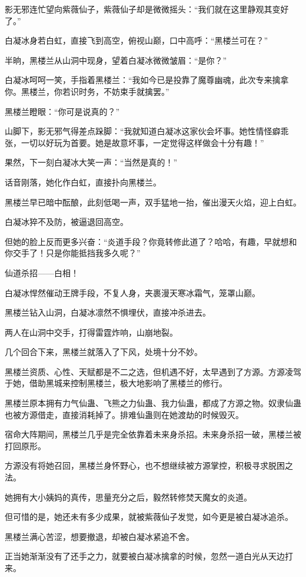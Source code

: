 \begin{this_body}
影无邪连忙望向紫薇仙子，紫薇仙子却是微微摇头：“我们就在这里静观其变好了。”

白凝冰身若白虹，直接飞到高空，俯视山巅，口中高呼：“黑楼兰可在？”

半晌，黑楼兰从山洞中现身，望着白凝冰微微皱眉：“是你？”

白凝冰呵呵一笑，手指着黑楼兰：“我如今已是投靠了魔尊幽魂，此次专来擒拿你。黑楼兰，你若识时务，不妨束手就擒罢。”

黑楼兰瞪眼：“你可是说真的？”

山脚下，影无邪气得差点跺脚：“我就知道白凝冰这家伙会坏事。她性情怪癖乖张，一切以好玩为首要。她是故意坏事，一定觉得这样做会十分有趣！”

果然，下一刻白凝冰大笑一声：“当然是真的！”

话音刚落，她化作白虹，直接扑向黑楼兰。

黑楼兰早已暗中酝酿，此刻低喝一声，双手猛地一抬，催出漫天火焰，迎上白虹。

白凝冰猝不及防，被逼退回高空。

但她的脸上反而更多兴奋：“炎道手段？你竟转修此道了？哈哈，有趣，早就想和你交手了！只是你能抵挡我多久呢？”

仙道杀招——白相！

白凝冰悍然催动王牌手段，不复人身，夹裹漫天寒冰霜气，笼罩山巅。

黑楼兰钻入山洞，白凝冰凛然不惧埋伏，直接冲杀进去。

两人在山洞中交手，打得雷霆炸响，山崩地裂。

几个回合下来，黑楼兰就落入了下风，处境十分不妙。

黑楼兰资质、心性、天赋都是不二之选，但机遇不好，太早遇到了方源。方源凌驾于她，借助黑城来控制黑楼兰，极大地影响了黑楼兰的修行。

黑楼兰原本拥有力气仙蛊、飞熊之力仙蛊、我力仙蛊，都成了方源之物。奴隶仙蛊也被方源借走，直接消耗掉了。排难仙蛊则在她渡劫的时候毁灭。

宿命大阵期间，黑楼兰几乎是完全依靠着未来身杀招。未来身杀招一破，黑楼兰被打回原形。

方源没有将她召回，黑楼兰身怀野心，也不想继续被方源掌控，积极寻求脱困之法。

她拥有大小姨妈的真传，思量充分之后，毅然转修焚天魔女的炎道。

但可惜的是，她还未有多少成果，就被紫薇仙子发觉，如今更是被白凝冰追杀。

黑楼兰满心苦涩，想要撤退，却被白凝冰紧追不舍。

正当她渐渐没有了还手之力，就要被白凝冰擒拿的时候，忽然一道白光从天边打来。


\end{this_body}

